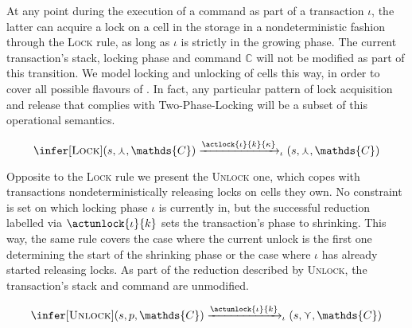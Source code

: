 At any point during the execution of a command as part of a transaction $\iota$, the latter can acquire a lock  on a cell in the storage in a nondeterministic fashion through the \textsc{Lock} rule, as long as $\iota$ is strictly in the growing phase. The current transaction's stack, locking phase and command $\mathds{C}$ will not be modified as part of this transition. We model locking and unlocking of cells this way, in order to cover all possible flavours of \tpl. In fact, any particular pattern of lock acquisition and release that complies with Two-Phase-Locking will be a subset of this operational semantics.

\[
\infer[\textsc{Lock}]
{
	(s, \curlywedge, \mathds{C})
	\xrightarrow{\actlock{\iota}{k}{\kappa}}_\iota
	(s, \curlywedge, \mathds{C})
}
{}
\]

Opposite to the \textsc{Lock} rule we present the \textsc{Unlock} one, which copes with transactions nondeterministically releasing locks on cells they own. No constraint is set on which locking phase $\iota$ is currently in, but the successful reduction labelled via $\actunlock{\iota}{k}$ sets the transaction's phase to shrinking. This way, the same rule covers the case where the current unlock is the first one determining the start of the shrinking phase or the case where $\iota$ has already started releasing locks. As part of the reduction described by \textsc{Unlock}, the transaction's stack and command are unmodified.

\[
\infer[\textsc{Unlock}]
{
	(s, p, \mathds{C})
	\xrightarrow{\actunlock{\iota}{k}}_\iota
	(s, \curlyvee, \mathds{C})
}
{}
\]